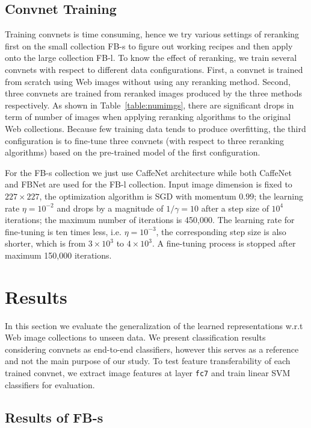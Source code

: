 \documentclass[preprint,12pt]{elsarticle}
\begin{document}
\subsection{Convnet Training}\label{sec:convsetting}
\noindent Training convnets is time consuming, hence we try various settings of reranking first on the small collection FB-s to figure out working recipes and then apply onto the large collection FB-l. To know the effect of reranking, we train several convnets with respect to different data configurations. First, a convnet is trained from scratch using Web images without using any reranking method. Second, three convnets are trained from reranked images produced by the three methods respectively. As shown in Table~\ref{table:numimgs}, there are significant drops in term of number of images when applying reranking algorithms to the original Web collections. Because few training data tends to produce overfitting, the third configuration is to fine-tune three convnets (with respect to three reranking algorithms) based on the pre-trained model of the first configuration. 

For the FB-s collection we just use CaffeNet architecture while both CaffeNet and FBNet are used for the FB-l collection. Input image dimension is fixed to $227\times 227$, the optimization algorithm is SGD with momentum $0.99$; the learning rate $\eta=10^{-2}$ and drops by a magnitude of $1/\gamma=10$ after a step size of $10^4$ iterations; the maximum number of iterations is 450,000. The learning rate for fine-tuning is ten times less, i.e. $\eta=10^{-3}$, the corresponding step size is also shorter, which is from $3\times 10^3$ to $4\times 10^3$. A fine-tuning process is stopped after maximum 150,000 iterations.

\section{Results}\label{sec:fb100}
\noindent In this section we evaluate the generalization of the learned representations w.r.t Web image collections to unseen data. We present classification results considering convnets as end-to-end classifiers, however this serves as a reference and not the main purpose of our study. To test feature transferability of each trained convnet, we extract image features at layer \texttt{fc7} and train linear SVM classifiers for evaluation. 
\subsection{Results of FB-s}
\end{document}
